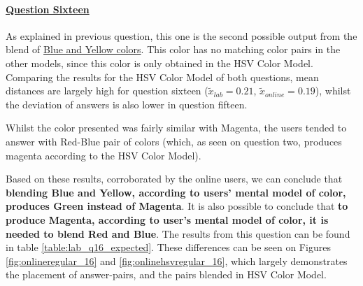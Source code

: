 \paragraph{\ul{Question Sixteen}}
%
As explained in previous question, this one is the second possible output from the blend of \ul{Blue and Yellow colors}. This color has no matching color pairs in the other models,
since this color is only obtained in the HSV Color Model. Comparing the results for the HSV Color Model of both questions, mean distances are largely high for question sixteen
($\tilde{x}_{lab} = 0.21$, $\tilde{x}_{online} = 0.19$), whilst the deviation of answers is also lower in question fifteen. \par
%
Whilst the color presented was fairly similar with Magenta, the users tended to answer with Red-Blue pair of colors (which, as seen on question two, produces magenta according
to the HSV Color Model). \par
%
Based on these results, corroborated by the online users, we can conclude that \textbf{blending Blue and Yellow, according to users' mental model of color, produces Green instead of Magenta}. It is also
possible to conclude that \textbf{to produce Magenta, according to user's mental model of color, it is needed to blend Red and Blue}. The results from
this question can be found in table \ref{table:lab_q16_expected}. These differences can be seen on Figures \ref{fig:onlineregular_16} and \ref{fig:onlinehsvregular_16}, which largely
demonstrates the placement of answer-pairs, and the pairs blended in HSV Color Model.
%
